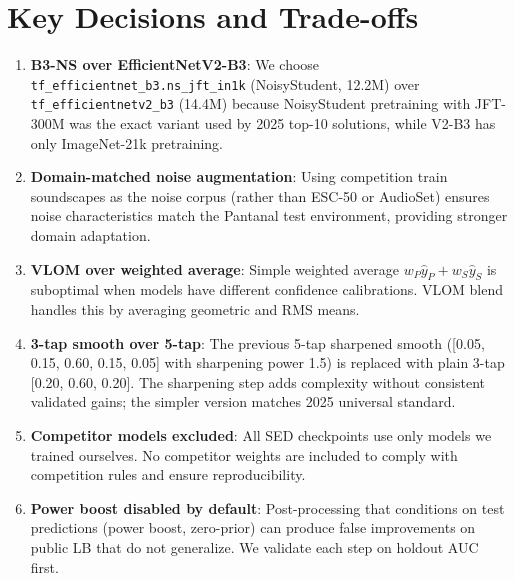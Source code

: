 \documentclass[11pt,a4paper]{article}
\begin{document}
\section{Key Decisions and Trade-offs}
\label{sec:decisions}

\begin{enumerate}[leftmargin=1.5em]

\item \textbf{B3-NS over EfficientNetV2-B3}: We choose \texttt{tf\_efficientnet\_b3.ns\_jft\_in1k}
  (NoisyStudent, 12.2M) over \texttt{tf\_efficientnetv2\_b3} (14.4M) because NoisyStudent
  pretraining with JFT-300M was the exact variant used by 2025 top-10 solutions, while
  V2-B3 has only ImageNet-21k pretraining.

\item \textbf{Domain-matched noise augmentation}: Using competition train soundscapes as
  the noise corpus (rather than ESC-50 or AudioSet) ensures noise characteristics
  match the Pantanal test environment, providing stronger domain adaptation.

\item \textbf{VLOM over weighted average}: Simple weighted average $w_P \hat{y}_P + w_S \hat{y}_S$
  is suboptimal when models have different confidence calibrations. VLOM blend
  handles this by averaging geometric and RMS means.

\item \textbf{3-tap smooth over 5-tap}: The previous 5-tap sharpened smooth
  ([0.05, 0.15, 0.60, 0.15, 0.05] with sharpening power 1.5) is replaced with
  plain 3-tap [0.20, 0.60, 0.20]. The sharpening step adds complexity without
  consistent validated gains; the simpler version matches 2025 universal standard.

\item \textbf{Competitor models excluded}: All SED checkpoints use only models
  we trained ourselves. No competitor weights are included to comply with competition rules
  and ensure reproducibility.

\item \textbf{Power boost disabled by default}: Post-processing that conditions on
  test predictions (power boost, zero-prior) can produce false improvements on
  public LB that do not generalize. We validate each step on holdout AUC first.

\end{enumerate}

\end{document}
